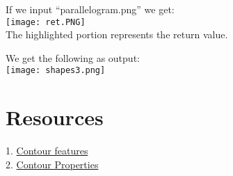 \documentclass[]{article}
\begin{document}
If we input ``parallelogram.png'' we get:\\
\texttt{[image: ret.PNG]}\\
The highlighted portion represents the return value.

We get the following as output:\\
\texttt{[image: shapes3.png]}

\section{Resources}\label{resources}

1. \href{http://opencv-python-tutroals.readthedocs.org/en/latest/py \\
\_tutorials/py\_imgproc/py\_contours/py\_contour\_features/py\\
\_contour\_features.html\#contour-features}{Contour features}\\
2. \href{http://docs.opencv.org/modules/imgproc/doc/structural\_analysis \\
\_and\_shape\_descriptors.html?highlight=findcontours\#arclength}{Contour Properties}
\end{document}
